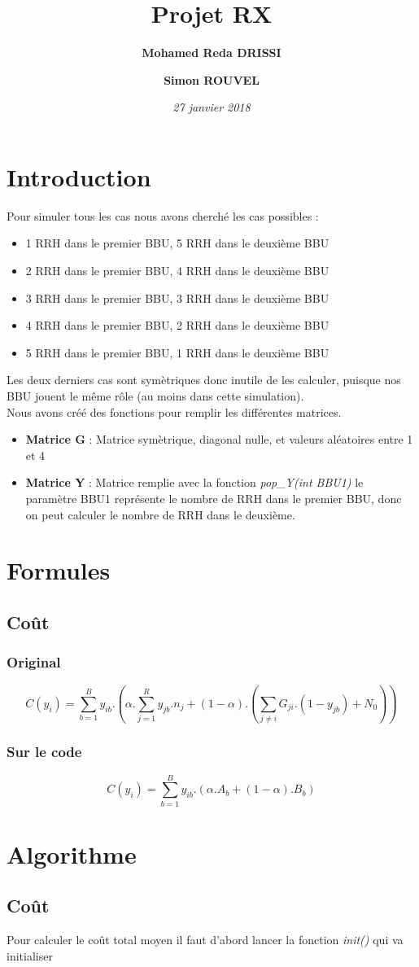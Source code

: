 \documentclass[a4paper,sans,titlepage,10pt]{article}
\title{Projet RX}
\author { \textbf{Mohamed Reda DRISSI }
			\and
		   \textbf{Simon ROUVEL}}
\date{\textit{27 janvier 2018}}
\begin{document}
\maketitle

\tableofcontents
\clearpage
\section{Introduction}
Pour simuler tous les cas nous avons cherché les cas possibles :
\begin{itemize}
	\item 1 RRH dans le premier BBU, 5 RRH dans le deuxième BBU
	\item 2 RRH dans le premier BBU, 4 RRH dans le deuxième BBU
	\item 3 RRH dans le premier BBU, 3 RRH dans le deuxième BBU
	\item 4 RRH dans le premier BBU, 2 RRH dans le deuxième BBU
	\item 5 RRH dans le premier BBU, 1 RRH dans le deuxième BBU
\end{itemize}
Les deux derniers cas sont symètriques donc inutile de les calculer, puisque nos BBU jouent
le même rôle (au moins dans cette simulation).\\
Nous avons créé des fonctions pour remplir les différentes matrices.
\begin{itemize}
	\item \textbf{Matrice G} : Matrice symètrique, diagonal nulle, et valeurs aléatoires entre 1 et 4
	\item \textbf{Matrice Y} : Matrice remplie avec la fonction \textit{pop\_Y(int BBU1)}
		le paramètre BBU1 représente le nombre de RRH dans le premier BBU, donc on peut
		calculer le nombre de RRH dans le deuxième.

\end{itemize}
\section{Formules}
\subsection{Coût}
\subsubsection{Original}
\begin{displaymath}
C(y_i)= \sum_{b=1}^By_{ib}.\left(\alpha.\sum_{j=1}^Ry_{jb}.n_j+(1-\alpha).(\sum_{j\neq i}G_{ji}.(1-y_{jb})+N_0)\right)
\end{displaymath}
\subsubsection{Sur le code}
\begin{displaymath}
C(y_i)= \sum_{b=1}^By_{ib}.(\alpha.A_b+(1-\alpha).B_b)
\end{displaymath}
\section{Algorithme}
\subsection{Coût}
Pour calculer le coût total moyen il faut d'abord lancer la fonction \textit{init()} 
qui va initialiser 
\end{document}
